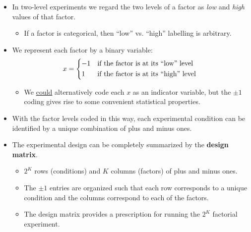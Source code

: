 \begin{itemize}
    \item In two-level experiments we regard the two levels of a factor as \emph{low} and \emph{high} values of that factor.
          \begin{itemize}[*]
              \item If a factor is categorical, then ``low'' vs. ``high'' labelling is arbitrary.
          \end{itemize}
    \item We represent each factor by a binary variable:
          \[ x=\begin{cases*}
                  -1 & if the factor is at its ``low'' level  \\
                  1  & if the factor is at its ``high'' level
              \end{cases*} \]
          \begin{itemize}[*]
              \item We \underline{could} alternatively code each $ x $ as an indicator variable, but the $ \pm 1 $ coding
                    gives rise to some convenient statistical properties.
          \end{itemize}
\end{itemize}
\begin{itemize}[$\rightarrow$]
    \item With the factor levels coded in this way, each experimental condition can be identified by a unique
          combination of plus and minus ones.
\end{itemize}
\begin{itemize}
    \item The experimental design can be completely summarized by the \textbf{design matrix}.
          \begin{itemize}
              \item $ 2^K $ rows (conditions) and $ K $ columns (factors) of plus and minus ones.
          \end{itemize}
          \begin{itemize}[$\rightarrow$]
              \item The $ \pm 1 $ entries are organized such that each row corresponds to a unique condition and the
                    columns correspond to each of the factors.
              \item The design matrix provides a prescription for running the $2^K$ factorial experiment.
          \end{itemize}
\end{itemize}
